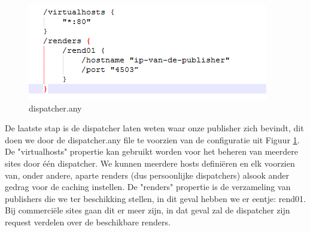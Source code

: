 \documentclass{article}
\begin{document}
	\par
	\begin{figure}[h!]
  		\includegraphics[width=\linewidth]{images/dispatcher-any.PNG}
  		\caption{dispatcher.any}
  		\label{fig:dispatcher-any}
	\end{figure}
	De laatste stap is de dispatcher laten weten waar onze publisher zich bevindt, dit doen we door de dispatcher.any file te voorzien van de configuratie uit Figuur \ref{fig:dispatcher-any}. De "virtualhosts" propertie kan gebruikt worden voor het beheren van meerdere sites door \'e\'en dispatcher. We kunnen meerdere hosts defini\"eren en elk voorzien van, onder andere, aparte renders (dus persoonlijke dispatchers) alsook ander gedrag voor de caching instellen. De "renders" propertie is de verzameling van publishers die we ter beschikking stellen, in dit geval hebben we er eentje: rend01. Bij commerci\"ele sites gaan dit er meer zijn, in dat geval zal de dispatcher zijn request verdelen over de beschikbare renders.
	
\end{document}
